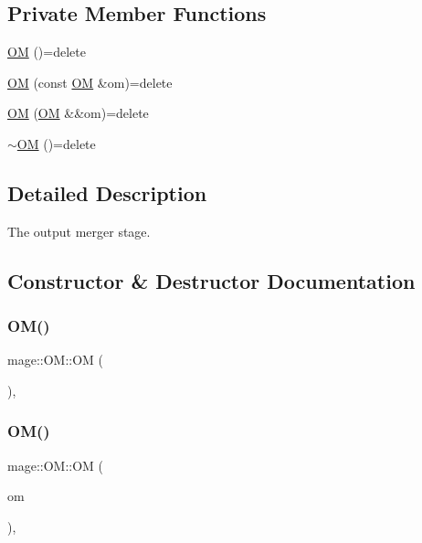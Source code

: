 \subsection*{Private Member Functions}
\begin{DoxyCompactItemize}
\item 
\hyperlink{structmage_1_1_o_m_a84e6baa413304dc201317aa9f5e9bf4f}{OM} ()=delete
\item 
\hyperlink{structmage_1_1_o_m_aaef0e65fadc8b427de606b1b7d1db680}{OM} (const \hyperlink{structmage_1_1_o_m}{OM} \&om)=delete
\item 
\hyperlink{structmage_1_1_o_m_a342e630f1aa38da3d48d592795c87e3b}{OM} (\hyperlink{structmage_1_1_o_m}{OM} \&\&om)=delete
\item 
\hyperlink{structmage_1_1_o_m_a2d416d2c21400b191d3abb36f6bb4c97}{$\sim$\+OM} ()=delete
\end{DoxyCompactItemize}


\subsection{Detailed Description}
The output merger stage. 

\subsection{Constructor \& Destructor Documentation}
\hypertarget{structmage_1_1_o_m_a84e6baa413304dc201317aa9f5e9bf4f}{}\label{structmage_1_1_o_m_a84e6baa413304dc201317aa9f5e9bf4f} 
\subsubsection{\texorpdfstring{O\+M()}{OM()}\hspace{0.1cm}{\footnotesize\ttfamily [1/3]}}
{\footnotesize\ttfamily mage\+::\+O\+M\+::\+OM (\begin{DoxyParamCaption}{ }\end{DoxyParamCaption})\hspace{0.3cm}{\ttfamily [private]}, {\ttfamily [delete]}}

\hypertarget{structmage_1_1_o_m_aaef0e65fadc8b427de606b1b7d1db680}{}\label{structmage_1_1_o_m_aaef0e65fadc8b427de606b1b7d1db680} 
\subsubsection{\texorpdfstring{O\+M()}{OM()}\hspace{0.1cm}{\footnotesize\ttfamily [2/3]}}
{\footnotesize\ttfamily mage\+::\+O\+M\+::\+OM (\begin{DoxyParamCaption}\item[{const \hyperlink{structmage_1_1_o_m}{OM} \&}]{om }\end{DoxyParamCaption})\hspace{0.3cm}{\ttfamily [private]}, {\ttfamily [delete]}}

